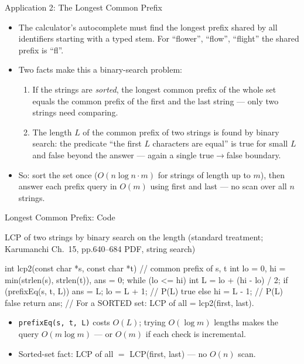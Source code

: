 \documentclass[aspectratio=169]{beamer}
\begin{document}
\begin{frame}{Application 2: The Longest Common Prefix}
  \begin{itemize}
    \item The calculator's autocomplete must find the longest prefix shared
      by all identifiers starting with a typed stem. For ``flower'',
      ``flow'', ``flight'' the shared prefix is ``fl''.
    \item Two facts make this a binary-search problem:
      \begin{enumerate}
        \item If the strings are \emph{sorted}, the longest common prefix of
          the whole set equals the common prefix of the first and the last
          string --- only two strings need comparing.
        \item The length $L$ of the common prefix of two strings is found by
          binary search: the predicate ``the first $L$ characters are equal''
          is true for small $L$ and false beyond the answer --- again a single
          true$\to$false boundary.
      \end{enumerate}
    \item So: sort the set once ($O(n \log n \cdot m)$ for strings of length
      up to $m$), then answer each prefix query in $O(m)$ using first and
      last --- no scan over all $n$ strings.
  \end{itemize}
\end{frame}

\begin{frame}[fragile]{Longest Common Prefix: Code}
  \footnotesize
  \begin{block}{LCP of two strings by binary search on the length
    (standard treatment; Karumanchi Ch.~15, pp.640--684 PDF, string search)}
\begin{semiverbatim}
int lcp2(const char *s, const char *t) {   // common prefix of s, t
  int lo = 0, hi = min(strlen(s), strlen(t)), ans = 0;
  while (lo <= hi) {
    int L = lo + (hi - lo) / 2;
    if (prefixEq(s, t, L)) { ans = L; lo = L + 1; }  // P(L) true
    else hi = L - 1;                                  // P(L) false
  }
  return ans;
}
// For a SORTED set: LCP of all = lcp2(first, last).
\end{semiverbatim}
  \end{block}
  \begin{itemize}
    \item \texttt{prefixEq(s, t, L)} costs $O(L)$; trying $O(\log m)$ lengths
      makes the query $O(m \log m)$ --- or $O(m)$ if each check is
      incremental.
    \item Sorted-set fact: LCP of all $=$ LCP(first, last) --- no $O(n)$ scan.
  \end{itemize}
\end{frame}
\end{document}
